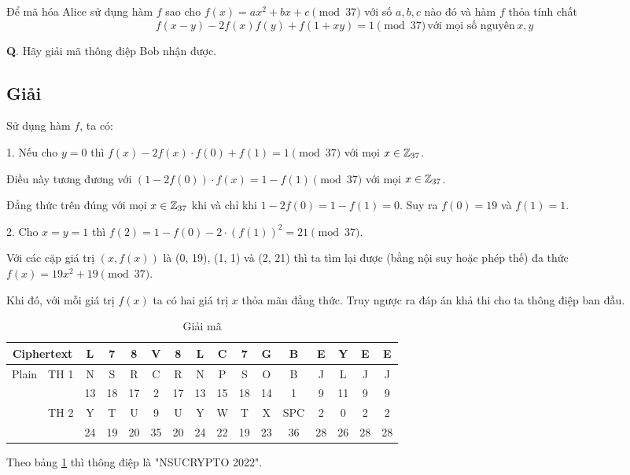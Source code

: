 Để mã hóa Alice sử dụng hàm $f$ sao cho $f(x) = a x^2 + b x + c \pmod{37}$ với số $a, b, c$ nào đó và hàm $f$ thỏa tính chất
\begin{equation*}
    f(x-y) - 2 f(x) f(y) + f(1 + xy) = 1 \pmod{37} \, \text{với mọi số nguyên} \, x, y
\end{equation*}

\textbf{Q}. Hãy giải mã thông điệp Bob nhận được.

\subsection*{Giải}

Sử dụng hàm $f$, ta có:

1. Nếu cho $y=0$ thì $f(x) - 2 f(x) \cdot f(0) + f(1) = 1 \pmod{37}$ với mọi $x \in \mathbb{Z}_{37}$.

Điều này tương đương với $(1 - 2 f(0)) \cdot f(x) = 1 - f(1) \pmod{37}$ với mọi $x \in \mathbb{Z}_{37}$.

Đẳng thức trên đúng với mọi $x \in \mathbb{Z}_{37}$ khi và chỉ khi $1 - 2 f(0) = 1 - f(1) = 0$. Suy ra $f(0) = 19$ và $f(1) = 1$.

2. Cho $x=y=1$ thì $f(2) = 1 - f(0) - 2 \cdot (f(1))^2 = 21 \pmod{37}$.

Với các cặp giá trị $(x, f(x))$ là (0, 19), (1, 1) và (2, 21) thì ta tìm lại được (bằng nội suy hoặc phép thế) đa thức $f(x) = 19 x^2 + 19 \pmod{37}$.

Khi đó, với mỗi giá trị $f(x)$ ta có hai giá trị $x$ thỏa mãn đẳng thức. Truy ngược ra đáp án khả thi cho ta thông điệp ban đầu.

\begin{table}[ht]
    \centering
    \begin{tabular}{|c|c|c|c|c|c|c|c|c|c|c|c|c|c|c|c|}
        \hline
        \multicolumn{2}{|c|}{Ciphertext} & L & 7 & 8 & V & 8 & L & C & 7 & G & B & E & Y & E & E \\ \hline
        \multirow{4}{*}{Plain} & \multirow{2}{*}{TH 1} & {\color{red}N} & {\color{red}S} & R & {\color{red}C} & {\color{red}R} & N & {\color{red}P} & S & {\color{red}O} & B & J & L & J & J \\ \cline{3-16}
        & & 13 & 18 & 17 & 2 & 17 & 13 & 15 & 18 & 14 & 1 & 9 & 11 & 9 & 9 \\ \cline{2-16}
        & \multirow{2}{*}{TH 2} & Y & T & {\color{red}U} & 9 & U & {\color{red}Y} & W & {\color{red}T} & X & {\color{red}SPC} & {\color{red}2} & {\color{red}0} & {\color{red}2} & {\color{red}2} \\ \cline{3-16}
        & & 24 & 19 & 20 & 35 & 20 & 24 & 22 & 19 & 23 & 36 & 28 & 26 & 28 & 28 \\ \hline
    \end{tabular}
    \caption{Giải mã}
    \label{nsucrypto22:p11}
\end{table}

Theo bảng \ref{nsucrypto22:p11} thì thông điệp là "NSUCRYPTO 2022".